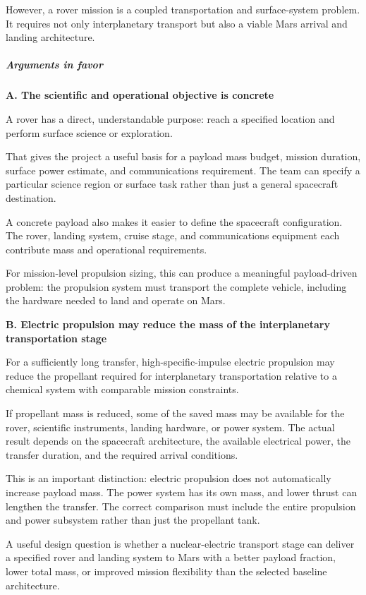 However, a rover mission is a coupled transportation and
surface-system problem. It requires not only interplanetary
transport but also a viable Mars arrival and landing architecture.

\subparagraph{Arguments in favor}

\textbf{A. The scientific and operational objective is concrete}

A rover has a direct, understandable purpose: reach a specified
location and perform surface science or exploration.

That gives the project a useful basis for a payload mass budget,
mission duration, surface power estimate, and communications
requirement. The team can specify a particular science region
or surface task rather than just a general spacecraft destination.

A concrete payload also makes it easier to define the spacecraft
configuration. The rover, landing system, cruise stage, and
communications equipment each contribute mass and operational
requirements.

For mission-level propulsion sizing, this can produce a meaningful
payload-driven problem: the propulsion system must transport
the complete vehicle, including the hardware needed to land
and operate on Mars.

\textbf{B. Electric propulsion may reduce the mass of
	the interplanetary transportation stage}

For a sufficiently long transfer, high-specific-impulse
electric propulsion may reduce the propellant required for
interplanetary transportation relative to a chemical system
with comparable mission constraints.

If propellant mass is reduced, some of the saved mass may
be available for the rover, scientific instruments, landing
hardware, or power system. The actual result depends on the
spacecraft architecture, the available electrical power, the
transfer duration, and the required arrival conditions.

This is an important distinction: electric propulsion does
not automatically increase payload mass. The power system
has its own mass, and lower thrust can lengthen the transfer.
The correct comparison must include the entire propulsion
and power subsystem rather than just the propellant tank.

A useful design question is whether a nuclear-electric
transport stage can deliver a specified rover and landing
system to Mars with a better payload fraction, lower total
mass, or improved mission flexibility than the selected
baseline architecture.

